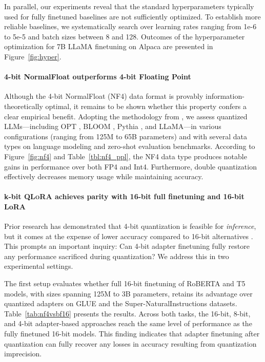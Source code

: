 In parallel, our experiments reveal that the standard hyperparameters typically used for fully finetuned baselines are not sufficiently optimized. To establish more reliable baselines, we systematically search over learning rates ranging from 1e-6 to 5e-5 and batch sizes between 8 and 128. Outcomes of the hyperparameter optimization for 7B LLaMA finetuning on Alpaca are presented in Figure~\ref{fig:hyper}.

\paragraph{4-bit NormalFloat outperforms 4-bit Floating Point}

Although the 4-bit NormalFloat (NF4) data format is provably information-theoretically optimal, it remains to be shown whether this property confers a clear empirical benefit. Adopting the methodology from \citet{dettmers2022case}, we assess quantized LLMs—including OPT \citep{zhang2022opt}, BLOOM \cite{scao2022bloom}, Pythia \cite{biderman2023pythia}, and LLaMA—in various configurations (ranging from 125M to 65B parameters) and with several data types on language modeling and zero-shot evaluation benchmarks. According to Figure~\ref{fig:nf4} and Table~\ref{tbl:nf4_ppl}, the NF4 data type produces notable gains in performance over both FP4 and Int4. Furthermore, double quantization effectively decreases memory usage while maintaining accuracy.

\paragraph{k-bit \textsc{QLoRA} achieves parity with 16-bit full finetuning and 16-bit LoRA}

Prior research has demonstrated that 4-bit quantization is feasible for \emph{inference}, but it comes at the expense of lower accuracy compared to 16-bit alternatives \citep{dettmers2022case,frantar2022gptq}. This prompts an important inquiry: Can 4-bit adapter finetuning fully restore any performance sacrificed during quantization? We address this in two experimental settings.

The first setup evaluates whether full 16-bit finetuning of RoBERTA and T5 models, with sizes spanning 125M to 3B parameters, retains its advantage over quantized adapters on GLUE and the Super-NaturalInstructions datasets. Table~\ref{tab:nf4vsbf16} presents the results. Across both tasks, the 16-bit, 8-bit, and 4-bit adapter-based approaches reach the same level of performance as the fully finetuned 16-bit models. This finding indicates that adapter finetuning after quantization can fully recover any losses in accuracy resulting from quantization imprecision.

